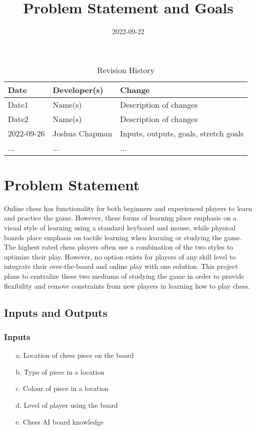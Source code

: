 \documentclass{article}
\title{Problem Statement and Goals\\\progname}
\author{\authname}
\date{2022-09-22}
\begin{document}
\maketitle

\begin{table}[hp]
\caption{Revision History} \label{TblRevisionHistory}
\begin{tabularx}{\textwidth}{llX}
\toprule
\textbf{Date} & \textbf{Developer(s)} & \textbf{Change}\\
\midrule
Date1 & Name(s) & Description of changes\\
Date2 & Name(s) & Description of changes\\
2022-09-26 & Joshua Chapman & Inputs, outputs, goals, stretch goals\\
... & ... & ...\\
\bottomrule
\end{tabularx}
\end{table}

\section{Problem Statement}

{Online chess has functionality for both beginners and experienced players to learn and practice the game. However, these forms of learning place emphasis on a visual style of learning using a standard keyboard and mouse, while physical boards place emphasis on tactile learning when learning or studying the game. The highest rated chess players often use a combination of the two styles to optimize their play. However, no option exists for players of any skill level to integrate their over-the-board and online play with one solution. This project plans to centralize these two mediums of studying the game in order to provide flexibility and remove constraints from new players in learning how to play chess.}

\subsection{Inputs and Outputs}

\subsubsection{Inputs}
\begin{enumerate}
    \item[a.] Location of chess piece on the board
    \item[b.] Type of piece in a location
    \item[c.] Colour of piece in a location
    \item[d.] Level of player using the board
    \item[e.] Chess AI board knowledge
\end{enumerate}
\end{document}

